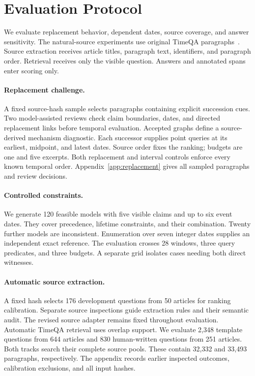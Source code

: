 \section{Evaluation Protocol}
\label{sec:protocol}

We evaluate replacement behavior, dependent dates, source coverage, and answer sensitivity.
The natural-source experiments use original TimeQA paragraphs~\citep{chen2021timeqa}.
Source extraction receives article titles, paragraph text, identifiers, and paragraph order.
Retrieval receives only the visible question.
Answers and annotated spans enter scoring only.

\paragraph{Replacement challenge.}
A fixed source-hash sample selects paragraphs containing explicit succession cues.
Two model-assisted reviews check claim boundaries, dates, and directed replacement links before temporal evaluation.
Accepted graphs define a source-derived mechanism diagnostic.
Each successor supplies point queries at its earliest, midpoint, and latest dates.
Source order fixes the ranking; budgets are one and five excerpts.
Both replacement and interval controls enforce every known temporal order.
Appendix~\ref{app:replacement} gives all sampled paragraphs and review decisions.

\paragraph{Controlled constraints.}
We generate 120 feasible models with five visible claims and up to six event dates.
They cover precedence, lifetime constraints, and their combination.
Twenty further models are inconsistent.
Enumeration over seven integer dates supplies an independent exact reference.
The evaluation crosses 28 windows, three query predicates, and three budgets.
A separate grid isolates cases needing both direct witnesses.

\paragraph{Automatic source extraction.}
A fixed hash selects 176 development questions from 50 articles for ranking calibration.
Separate source inspections guide extraction rules and their semantic audit.
The revised source adapter remains fixed throughout evaluation.
Automatic TimeQA retrieval uses overlap support.
We evaluate 2,348 template questions from 644 articles and 830 human-written questions from 251 articles.
Both tracks search their complete source pools.
These contain 32,332 and 33,493 paragraphs, respectively.
The appendix records earlier inspected outcomes, calibration exclusions, and all input hashes.

